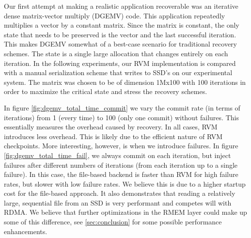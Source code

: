 Our first attempt at making a realistic application recoverable was an iterative
dense matrix-vector multiply (DGEMV) code. This application repeatedly
multiplies a vector by a constant matrix. Since the matrix is constant, the
only state that needs to be preserved is the vector and the last successful
iteration. This makes DGEMV somewhat of a best-case scenario for traditional
recovery schemes. The state is a single large allocation that changes entirely
on each iteration. In the following experiments, our RVM implementation is
compared with a manual serialization scheme that writes to SSD's on our
experimental system. The matrix was chosen to be of dimension 1Mx100 with 100
iterations in order to maximize the critical state and stress the recovery
schemes.


In figure \ref{fig:dgemv_total_time_commit} we vary the commit rate (in terms of
iterations) from 1 (every time) to 100 (only one commit) without failures. This
essentially measures the overhead caused by recovery. In all cases, RVM
introduces less overhead. This is likely due to the efficient nature of RVM
checkpoints. More interesting, however, is when we introduce failures. In figure
\ref{fig:dgemv_total_time_fail}, we always commit on each iteration, but inject
failures after different numbers of iterations (from each iteration up to a
single failure). In this case, the file-based backend is faster than RVM for
high failure rates, but slower with low failure rates. We believe this is due to
a higher startup cost for the file-based approach. It also demonstrates that
reading a relatively large, sequential file from an SSD is very performant and
competes will with RDMA. We believe that further optimizations in the RMEM layer
could make up some of this difference, see \ref{sec:conclusion} for some possible
performance enhancements.


